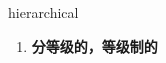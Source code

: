 
\begin{frame}
{\huge hierarchical}
\begin{center}
\begin{enumerate}\Large
  \item \textbf{分等级的，等级制的}
\end{enumerate}
\end{center}
\end{frame}
